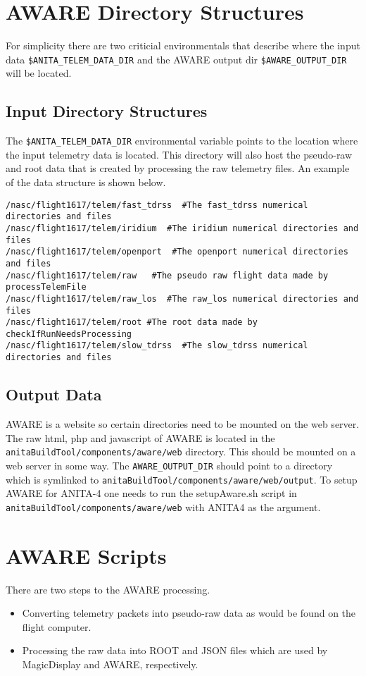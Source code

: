 \documentclass{article}
\begin{document}
\section{AWARE Directory Structures}
For simplicity there are two criticial environmentals that describe where the input data {\tt \$ANITA\_TELEM\_DATA\_DIR} and the AWARE output dir {\tt \$AWARE\_OUTPUT\_DIR} will be located.

\subsection{Input Directory Structures}
The {\tt \$ANITA\_TELEM\_DATA\_DIR} environmental variable points to the location where the input telemetry data is located. This directory will also host the pseudo-raw and root data that is created by processing the raw telemetry files. An example of the data structure is shown below.
\begin{verbatim}
/nasc/flight1617/telem/fast_tdrss  #The fast_tdrss numerical directories and files
/nasc/flight1617/telem/iridium  #The iridium numerical directories and files
/nasc/flight1617/telem/openport  #The openport numerical directories and files
/nasc/flight1617/telem/raw   #The pseudo raw flight data made by processTelemFile
/nasc/flight1617/telem/raw_los  #The raw_los numerical directories and files
/nasc/flight1617/telem/root #The root data made by checkIfRunNeedsProcessing
/nasc/flight1617/telem/slow_tdrss  #The slow_tdrss numerical directories and files
\end{verbatim}

\subsection{Output Data}
AWARE is a website so certain directories need to be mounted on the web server. The raw html, php and javascript of AWARE is located in the {\tt anitaBuildTool/components/aware/web} directory. This should be mounted on a web server in some way. The {\tt AWARE\_OUTPUT\_DIR} should point to a directory which is symlinked to {\tt anitaBuildTool/components/aware/web/output}. To setup AWARE for ANITA-4 one needs to run the setupAware.sh script in {\tt anitaBuildTool/components/aware/web} with ANITA4 as the argument.


\section{AWARE Scripts}
There are two steps to the AWARE processing.
\begin{itemize}
\item Converting telemetry packets into pseudo-raw data as would be found on the flight computer.
\item Processing the raw data into ROOT and JSON files which are used by MagicDisplay and AWARE, respectively.
\end{itemize}
\end{document}
